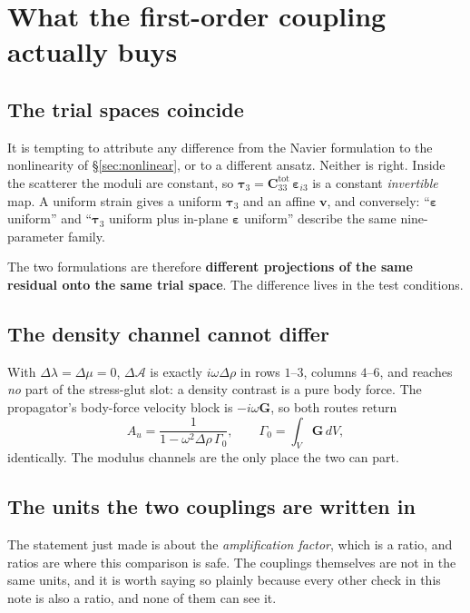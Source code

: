 \documentclass[11pt,a4paper]{article}
\newcommand{\bC}{\mathbf{C}}
\newcommand{\bv}{\mathbf{v}}
\newcommand{\bta}{\boldsymbol{\tau}}
\newcommand{\bG}{\mathbf{G}}
\newcommand{\dA}{\Delta\mathcal{A}}
\begin{document}
\section{What the first-order coupling actually buys}\label{sec:whatitbuys}

\subsection{The trial spaces coincide}

It is tempting to attribute any difference from the Navier formulation to the
nonlinearity of \S\ref{sec:nonlinear}, or to a different ansatz.  Neither is
right.  Inside the scatterer the moduli are constant, so
$\bta_3 = \bC_{33}^{\text{tot}}\,\boldsymbol\varepsilon_{i3}$ is a constant
\emph{invertible} map.  A uniform strain gives a uniform $\bta_3$ and an affine
$\bv$, and conversely: ``$\boldsymbol\varepsilon$ uniform'' and ``$\bta_3$
uniform plus in-plane $\boldsymbol\varepsilon$ uniform'' describe the same
nine-parameter family.

The two formulations are therefore \textbf{different projections of the same
residual onto the same trial space}.  The difference lives in the test
conditions.

\subsection{The density channel cannot differ}

With $\Delta\lambda = \Delta\mu = 0$, $\dA$ is exactly $i\omega\Delta\rho$ in
rows $1$--$3$, columns $4$--$6$, and reaches \emph{no} part of the stress-glut
slot: a density contrast is a pure body force.  The propagator's body-force
velocity block is $-i\omega\bG$, so both routes return
\begin{equation}\label{eq:amplification}
  A_u = \frac{1}{1 - \omega^2\Delta\rho\,\Gamma_0},
  \qquad \Gamma_0 = \int_V \bG\,dV,
\end{equation}
identically.  The modulus channels are the only place the two can part.

\subsection{The units the two couplings are written in}\label{sec:units}

The statement just made is about the \emph{amplification factor}, which is a
ratio, and ratios are where this comparison is safe.  The couplings themselves
are not in the same units, and it is worth saying so plainly because every other
check in this note is also a ratio, and none of them can see it.
\end{document}
